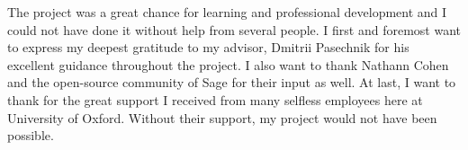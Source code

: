The project was a great chance for learning and professional development and 
I could not have done it without help from several people. I first and 
foremost want to express my deepest gratitude to my advisor, Dmitrii Pasechnik for his excellent guidance throughout the project.  
I also want to thank Nathann Cohen and the open-source community 
of Sage for their input as well. At last, I want to thank 
for the great support I received from many selfless employees 
here at University of Oxford. Without their support, my project would not have been possible. 
